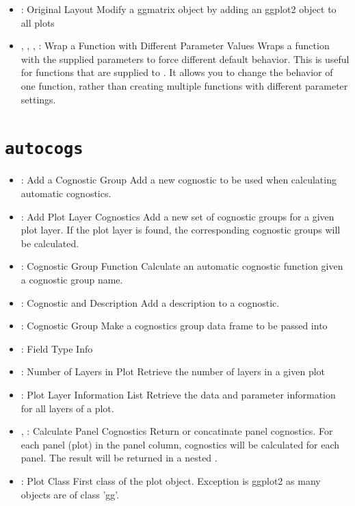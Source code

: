 \documentclass[stat,dissertation]{puthesis}\usepackage[]{graphicx}\usepackage{xcolor}
\newcommand{\pkg}[1]{\texttt{#1}}
\newcommand{\autocogs}{\pkg{autocogs}}
\newcommand{\tick}{\item[-]}
\begin{document}
\begin{itemize}
  \tick {}: Original  Layout  \newline Modify a ggmatrix object by adding an ggplot2 object to all plots
  \tick {}, , , : Wrap a Function with Different Parameter Values \newline Wraps a function with the supplied parameters to force different default behavior. This is useful for functions that are supplied to . It allows you to change the behavior of one function, rather than creating multiple functions with different parameter settings.
\end{itemize}



\section{\autocogs}

\begin{itemize}
  \tick {}: Add a Cognostic Group \newline Add a new cognostic to be used when calculating automatic cognostics.
  \tick {}: Add Plot Layer Cognostics \newline Add a new set of cognostic groups for a given plot layer. If the plot layer is found, the corresponding cognostic groups will be calculated.
  \tick {}: Cognostic Group Function \newline Calculate an automatic cognostic function given a cognostic group name.
  \tick {}: Cognostic and Description \newline Add a description to a cognostic.
  \tick {}: Cognostic Group  \newline Make a cognostics group data frame to be passed into 
  \tick {}: Field Type Info \newline
  \tick {}: Number of Layers in Plot \newline Retrieve the number of layers in a given plot
  \tick {}: Plot Layer Information List \newline Retrieve the data and parameter information for all layers of a plot.
  \tick {}, : Calculate Panel Cognostics \newline Return or concatinate panel cognostics. For each panel (plot) in the panel column, cognostics will be calculated for each panel. The result will be returned in a nested .
  \tick {}: Plot Class \newline First class of the plot object. Exception is ggplot2 as many objects are of class ’gg’.
\end{itemize}
\end{document}
